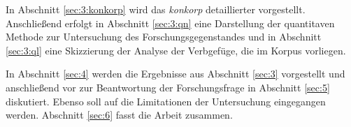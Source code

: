 
In Abschnitt \ref{sec:3:konkorp} wird das \textit{konkorp} detaillierter vorgestellt. Anschließend erfolgt in Abschnitt \ref{sec:3:qn} eine Darstellung der quantitaven Methode zur Untersuchung des Forschungsgegenstandes und in Abschnitt \ref{sec:3:ql} eine Skizzierung der Analyse der Verbgefüge, die im Korpus vorliegen.

In Abschnitt \ref{sec:4} werden die Ergebnisse aus Abschnitt \ref{sec:3} vorgestellt und anschließend vor zur Beantwortung der Forschungsfrage in Abschnitt \ref{sec:5} diskutiert. Ebenso soll auf die Limitationen der Untersuchung eingegangen werden. Abschnitt \ref{sec:6} fasst die Arbeit zusammen.

